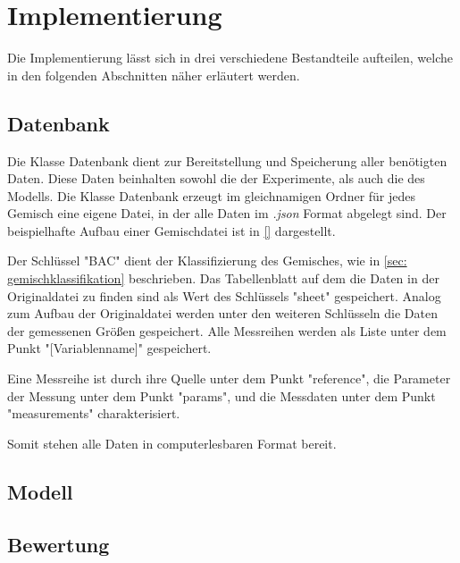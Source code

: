 \documentclass[../thesis.tex]{subfiles}
\begin{document}
	
\makeatletter %
\makeatother

\chapter{Implementierung}
\label{chp: implementierung}

Die Implementierung lässt sich in drei verschiedene Bestandteile aufteilen, welche in den folgenden Abschnitten näher erläutert werden.

\section{Datenbank}

Die Klasse Datenbank dient zur Bereitstellung und Speicherung aller benötigten Daten. Diese Daten beinhalten sowohl die der Experimente, als auch die des Modells. Die Klasse Datenbank erzeugt im gleichnamigen Ordner für jedes Gemisch eine eigene Datei, in der alle Daten im \textit{.json} Format abgelegt sind. Der beispielhafte Aufbau einer Gemischdatei ist in \autoref{} dargestellt.

Der Schlüssel "BAC" dient der Klassifizierung des Gemisches, wie in \autoref{sec: gemischklassifikation} beschrieben. Das Tabellenblatt auf dem die Daten in der Originaldatei zu finden sind als Wert des Schlüssels "sheet" gespeichert. Analog zum Aufbau der Originaldatei werden unter den weiteren Schlüsseln die Daten der gemessenen Größen gespeichert. Alle Messreihen werden als Liste unter dem Punkt "[Variablenname]" gespeichert.

Eine Messreihe ist durch ihre Quelle unter dem Punkt "reference", die Parameter der Messung unter dem Punkt "params", und die Messdaten unter dem Punkt "measurements" charakterisiert.

Somit stehen alle Daten in computerlesbaren Format bereit.

\section{Modell}

\section{Bewertung}
\end{document}
